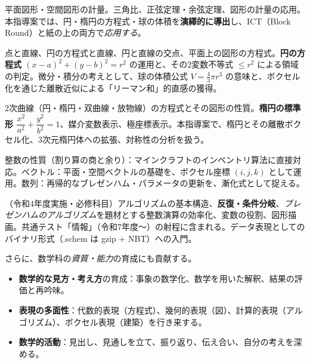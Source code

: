 \documentclass[12pt,a4paper]{scrartcl}
\newcommand{\acc}[1]{\textcolor{accent}{\textbf{#1}}}
\begin{document}
\begin{shidou}
平面図形・空間図形の計量。三角比、正弦定理・余弦定理、図形の計量の応用。本指導案では、円・楕円の方程式・球の体積を\acc{演繹的に導出}し、ICT（Block Round）と紙の上の両方で\emph{応用する}。
\end{shidou}

\begin{shidou}
点と直線、円の方程式と直線、円と直線の交点、平面上の図形の方程式。\acc{円の方程式 $(x-a)^2 + (y-b)^2 = r^2$} の運用と、その2変数不等式 $\leq r^2$ による領域の判定。微分・積分の考えとして、球の体積公式 $V=\tfrac{4}{3}\pi r^3$ の意味と、ボクセル化を通じた離散近似による「リーマン和」的直感の獲得。
\end{shidou}

\begin{shidou}
2次曲線（円・楕円・双曲線・放物線）の方程式とその図形の性質。\acc{楕円の標準形 $\dfrac{x^2}{a^2} + \dfrac{y^2}{b^2} = 1$}、媒介変数表示、極座標表示。本指導案で、楕円とその離散ボクセル化、3次元楕円体への拡張、対称性の分析を扱う。
\end{shidou}

\begin{shidou}
整数の性質（割り算の商と余り）：マインクラフトのインベントリ算法に直接対応。ベクトル：平面・空間ベクトルの基礎を、ボクセル座標 $(i, j, k)$ として運用。数列：再帰的なブレゼンハム・パラメータの更新を、漸化式として捉える。
\end{shidou}

\begin{shidou}
（令和4年度実施・必修科目）アルゴリズムの基本構造、\acc{反復・条件分岐}、\emph{ブレゼンハムのアルゴリズム}を題材とする整数演算の効率化、変数の役割、図形描画。共通テスト「情報」（令和7年度〜）の射程に含まれる。データ表現としてのバイナリ形式（.schem は gzip + NBT）への入門。
\end{shidou}

\medskip
さらに、数学科の\emph{資質・能力}の育成にも貢献する。

\begin{itemize}[leftmargin=1.3em,itemsep=0.15em,topsep=0.3em]
  \item \acc{数学的な見方・考え方}の育成：事象の数学化、数学を用いた解釈、結果の評価と再吟味。
  \item \acc{表現の多面性}：代数的表現（方程式）、幾何的表現（図）、計算的表現（アルゴリズム）、ボクセル表現（建築）を行き来する。
  \item \acc{数学的活動}：見出し、見通しを立て、振り返り、伝え合い、自分の考えを深める。
\end{itemize}
\end{document}
